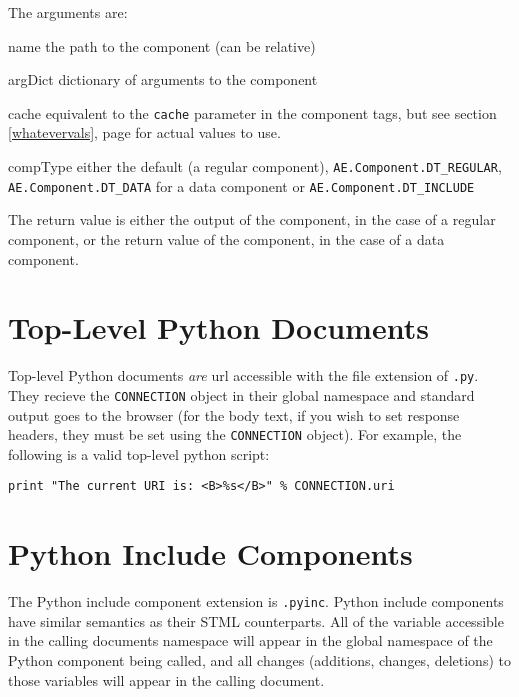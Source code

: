 \documentclass{manual}
\begin{document}
The arguments are:
\begin{argdesc}
\item[name] the path to the component (can be relative)
\item[argDict] dictionary of arguments to the component
\item[cache] equivalent to the \texttt{cache} parameter in the
component tags, but see section \ref{whatevervals}, page
\pageref{whatevervals} for actual values to use.
\item[compType] either the default (a regular
component), \texttt{AE.Component.DT_REGULAR},
\texttt{AE.Component.DT_DATA} for a data component or
\texttt{AE.Component.DT_INCLUDE}
\end{argdesc}



The return value is either the output of the component, in the case of
a regular component, or the return value of the component, in the case
of a data component.





\section{Top-Level Python Documents}
\label{pythontl}
Top-level Python documents \emph{are} url accessible with the file
extension of \texttt{.py}.  They recieve
the \texttt{CONNECTION} object in their global
namespace and standard output goes to the browser (for the body text, if
you wish to set response headers, they must be set using the
\texttt{CONNECTION} object).  For example, the following is a valid
top-level python script: 

\begin{verbatim}
print "The current URI is: <B>%s</B>" % CONNECTION.uri
\end{verbatim}




\section{Python Include Components}
\label{pythonincl}
The Python include component extension is \texttt{.pyinc}.
Python include components have similar semantics as their STML
counterparts.  All of the variable accessible in the calling documents
namespace will appear in the global namespace of the Python component
being called, and all changes (additions, changes, deletions) to those
variables will appear in the calling document.  
\end{document}
